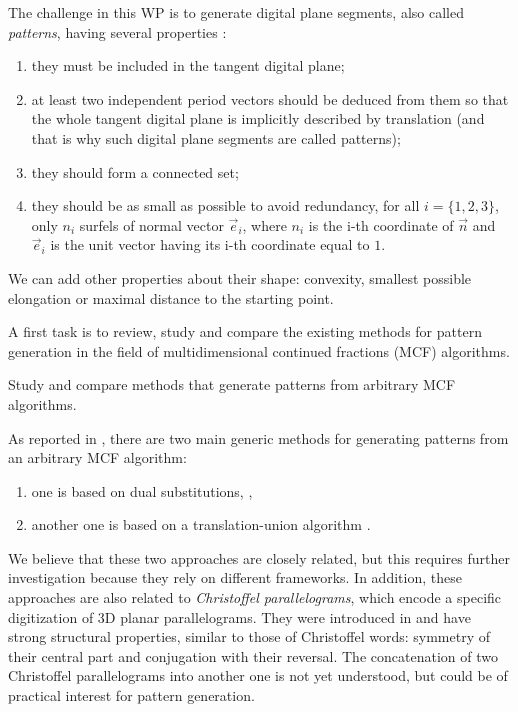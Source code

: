 The challenge in this WP is to generate digital plane segments, also called
\emph{patterns}, having several properties \cite{Jamet2016}:
\begin{enumerate}[label=(P\arabic*)]
\item they must be included in the tangent digital plane; \label{prop:inside}
\item at least two independent period vectors should be deduced from them
  so that the whole tangent digital plane is implicitly described by translation
  (and that is why such digital plane segments are called patterns); \label{prop:period}
\item they should form a connected set; \label{prop:connect}
\item they should be as small as possible to avoid redundancy,
  \eg for all $i=\{1,2,3\}$, only $n_i$ surfels of normal vector $\vec{e}_i$,
  where $n_i$ is the i-th coordinate of $\vec{n}$ and $\vec{e}_i$ is the unit
  vector having its i-th coordinate equal to $1$. \label{prop:small}
\end{enumerate}
We can add other properties about their shape: 
convexity, smallest possible elongation or maximal distance to the starting point.

A first task is to review, study and compare the existing methods for pattern generation
in the field of multidimensional continued fractions (MCF) algorithms. 
\begin{Task}
  \label{task:genmeth}
  Study and compare methods that generate patterns from arbitrary MCF algorithms. 
\end{Task}

As reported in , there are two main generic methods for generating patterns
from an arbitrary MCF algorithm:
\begin{enumerate}[label=(M\arabic*)]
\item one is based on dual substitutions, \eg \cite{Fernique2009}, \label{m:sub}
\item another one is based on a translation-union algorithm \cite{Jamet2016}. \label{m:tu}
\end{enumerate}
We believe that these two approaches are closely related, but this requires
further investigation because they rely on different frameworks.
In addition, these approaches are also related to \emph{Christoffel parallelograms},
which encode a specific digitization of 3D planar parallelograms. They were introduced in
\cite{Labbe2015} and have strong structural properties, similar to those of Christoffel words:
symmetry of their central part and conjugation with their reversal.
The concatenation of two Christoffel parallelograms into another one
is not yet understood, but could be of practical interest for pattern generation. 

